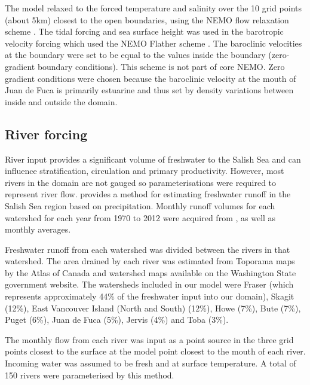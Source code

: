 \documentclass[pdftex,10pt]{article}
\begin{document}
The model relaxed to the forced temperature and salinity over the 10 grid points (about 5km) closest to the open boundaries, using the NEMO flow relaxation scheme \citep{madec2008nemo}. %
The tidal forcing and sea surface height was used in the barotropic velocity forcing which used the NEMO Flather scheme \citep{madec2008nemo}. %
The baroclinic velocities at the boundary were set to be equal to the values inside the boundary (zero-gradient boundary conditions).  This scheme is not part of core NEMO.  Zero gradient conditions were chosen because the baroclinic velocity at the mouth of Juan de Fuca is primarily estuarine and thus set by density variations between inside and outside the domain.

\subsection{River forcing}
River input provides a significant volume of freshwater to the Salish Sea and can influence stratification, circulation and primary productivity. However, most rivers in the domain are not gauged so parameterisations were required to represent river flow. \citet{morrison2011rivers} provides a method for estimating freshwater runoff in the Salish Sea region based on precipitation. Monthly runoff volumes for each watershed for each year from 1970 to 2012 were acquired from \citet{morrison2011rivers}, as well as monthly averages. 

Freshwater runoff from each watershed was divided between the rivers in that watershed. The area drained by each river was estimated from Toporama maps by the Atlas of Canada and watershed maps available on the Washington State government website. The watersheds included in our model were Fraser (which represents approximately 44\% of the freshwater input into our domain), Skagit (12\%), East Vancouver Island (North and South) (12\%), Howe (7\%), Bute (7\%), Puget (6\%), Juan de Fuca (5\%), Jervis (4\%) and Toba (3\%). 

The monthly flow from each river was input as a point source in the three grid points closest to the surface at the model point closest to the mouth of each river. Incoming water was assumed to be fresh and at surface temperature. A total of 150 rivers were parameterised by this method. 

\end{document}
